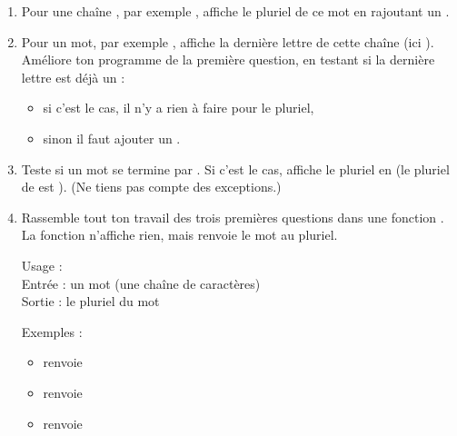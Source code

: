 \documentclass[11pt,class=report,crop=false]{standalone}
\begin{document}
\begin{activite}


\begin{enumerate}
  \item Pour une chaîne , par exemple , affiche le pluriel de ce mot en rajoutant un . 
  
  \item Pour un mot, par exemple , affiche la dernière lettre de cette chaîne (ici ). Améliore ton programme de la première question, en testant si la dernière lettre est déjà un  :
  \begin{itemize}
    \item si c'est le cas, il n'y a rien à faire pour le pluriel,
    \item sinon il faut ajouter un  .
  \end{itemize} 

  \item Teste si un mot se termine par . Si c'est le cas, affiche le pluriel en  (le pluriel de 
  est ). (Ne tiens pas compte des exceptions.)
  
  \item Rassemble tout ton travail des trois premières questions dans une fonction . La fonction n'affiche rien, mais renvoie le mot au pluriel.
  
  \medskip
  
  \begin{fonction}
  Usage :  \\
  Entrée : un mot (une chaîne de caractères) \\
  Sortie : le pluriel du mot 
  
  \bigskip
  
  Exemples : 
  \begin{itemize}
    \item {} renvoie 
    \item {} renvoie   
    \item {} renvoie          
  \end{itemize}     
  \end{fonction}


\end{enumerate}
\end{activite}
\end{document}
